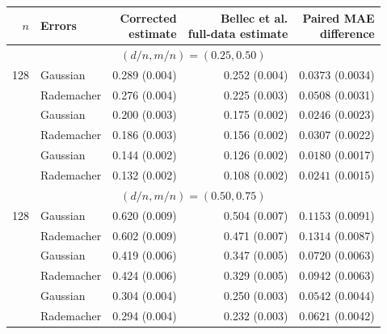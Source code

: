 \begingroup
\begin{tabular}{@{}rlrrr@{}}
\toprule
$n$ & Errors & \shortstack{Corrected\\estimate} & \shortstack{Bellec et al.\\full-data estimate} & \shortstack{Paired MAE\\difference} \\
\midrule
\multicolumn{5}{c}{$(d/n,m/n)=(0.25,0.50)$} \\
\midrule
128 & Gaussian & 0.289 (0.004) & 0.252 (0.004) & $\mathbf{0.0373}$ (0.0034) \\
 & Rademacher & 0.276 (0.004) & 0.225 (0.003) & $\mathbf{0.0508}$ (0.0031) \\
\addlinespace[3pt]
256 & Gaussian & 0.200 (0.003) & 0.175 (0.002) & $\mathbf{0.0246}$ (0.0023) \\
 & Rademacher & 0.186 (0.003) & 0.156 (0.002) & $\mathbf{0.0307}$ (0.0022) \\
\addlinespace[3pt]
512 & Gaussian & 0.144 (0.002) & 0.126 (0.002) & $\mathbf{0.0180}$ (0.0017) \\
 & Rademacher & 0.132 (0.002) & 0.108 (0.002) & $\mathbf{0.0241}$ (0.0015) \\
\midrule
\multicolumn{5}{c}{$(d/n,m/n)=(0.50,0.75)$} \\
\midrule
128 & Gaussian & 0.620 (0.009) & 0.504 (0.007) & $\mathbf{0.1153}$ (0.0091) \\
 & Rademacher & 0.602 (0.009) & 0.471 (0.007) & $\mathbf{0.1314}$ (0.0087) \\
\addlinespace[3pt]
256 & Gaussian & 0.419 (0.006) & 0.347 (0.005) & $\mathbf{0.0720}$ (0.0063) \\
 & Rademacher & 0.424 (0.006) & 0.329 (0.005) & $\mathbf{0.0942}$ (0.0063) \\
\addlinespace[3pt]
512 & Gaussian & 0.304 (0.004) & 0.250 (0.003) & $\mathbf{0.0542}$ (0.0044) \\
 & Rademacher & 0.294 (0.004) & 0.232 (0.003) & $\mathbf{0.0621}$ (0.0042) \\
\bottomrule
\end{tabular}
\endgroup
